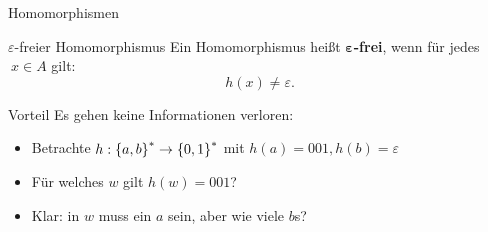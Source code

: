 

\begin{frame}{Homomorphismen}
	\begin{block}{$\varepsilon$-freier Homomorphismus}
		Ein Homomorphismus heißt \textbf{$\mathbf{\varepsilon}$-frei}, wenn für jedes $\ x\in A$ gilt:
		$$ h(x) \neq \varepsilon. $$
	\end{block}

	\begin{exampleblock}{Vorteil}
		\pause Es gehen keine Informationen verloren:\\
		\begin{itemize}
			\item Betrachte $h: \left\{ a,b \right\}^* \to \left\{ 0,1 \right\}^*$ mit $h(a)=001, h(b)=\varepsilon$
			\item Für welches $w$ gilt $h(w)=001$?
			\item Klar: in $w$ muss ein $a$ sein, aber wie viele $b$s?
		\end{itemize}
	\end{exampleblock}
\end{frame}

